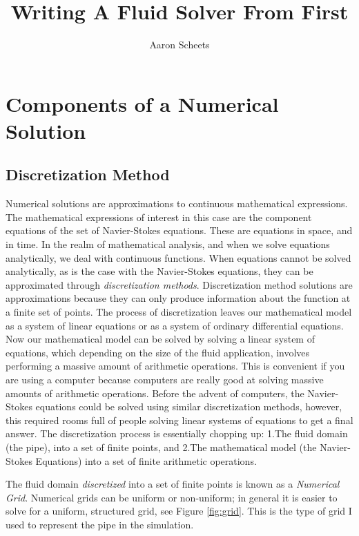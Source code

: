 \documentclass[twocolumn,12pth]{article}
\title{Writing A Fluid Solver From First}
\author{Aaron Scheets}
\begin{document}
\maketitle

\section{Components of a Numerical Solution}

\subsection{Discretization Method}

Numerical solutions are approximations to continuous mathematical expressions.
The mathematical expressions of interest in this case are the component equations of the set of Navier-Stokes equations.
These are equations in space, and in time. 
In the realm of mathematical analysis, and when we solve equations analytically, we deal with continuous functions.
When equations cannot be solved analytically, as is the case with the Navier-Stokes equations, they can be approximated through \textit{discretization methods}.
Discretization method solutions are approximations because they can only produce information about the function at a finite set of points.
The process of discretization leaves our mathematical model as a system of linear equations or as a system of ordinary differential equations.
Now our mathematical model can be solved by solving a linear system of equations, which depending on the size of the fluid application, involves performing a massive amount of arithmetic operations.
This is convenient if you are using a computer because computers are really good at solving massive amounts of arithmetic operations.
Before the advent of computers, the Navier-Stokes equations could be solved using similar discretization methods, however, this required rooms full of people solving linear systems of equations to get a final answer.
The discretization process is essentially chopping up: 1.The fluid domain (the pipe), into a set of finite points, and 2.The mathematical model (the Navier-Stokes Equations) into a set of finite arithmetic operations.

The fluid domain \textit{discretized} into a set of finite points is known as a \textit{Numerical Grid}.
Numerical grids can be uniform or non-uniform; in general it is easier to solve for a uniform, structured grid, see Figure \ref{fig:grid}.
This is the type of grid I used to represent the pipe in the simulation.
\end{document}
